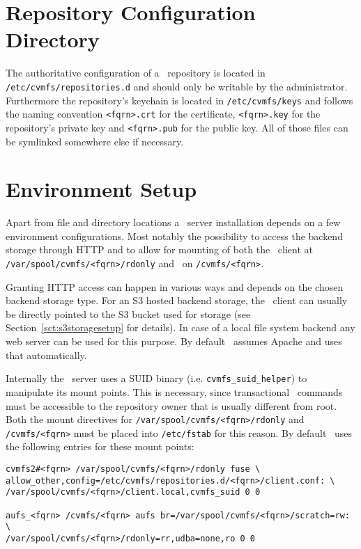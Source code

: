 \pagebreak

\section{Repository Configuration Directory}
The authoritative configuration of a \cvmfs\ repository is located in \texttt{/etc/cvmfs/repositories.d} and should only be writable by the administrator.
Furthermore the repository's keychain is located in \texttt{/etc/cvmfs/keys} and follows the naming convention \texttt{<fqrn>.crt} for the certificate, \texttt{<fqrn>.key} for the repository's private key and \texttt{<fqrn>.pub} for the public key.
All of those files can be symlinked somewhere else if necessary.

\pagebreak

\section{Environment Setup}
Apart from file and directory locations a \cvmfs\ server installation depends on a few environment configurations.
Most notably the possibility to access the backend storage through HTTP and to allow for mounting of both the \cvmfs\ client at \texttt{/var/spool/cvmfs/<fqrn>/rdonly} and \aufs\ on \texttt{/cvmfs/<fqrn>}.

Granting HTTP access can happen in various ways and depends on the chosen backend storage type.
For an S3 hosted backend storage, the \cvmfs\ client can usually be directly pointed to the S3 bucket used for storage (see Section~\ref{sct:s3storagesetup} for details).
In case of a local file system backend any web server can be used for this purpose.
By default \cvmfs\ assumes Apache and uses that automatically.

Internally the \cvmfs\ server uses a SUID binary (i.e. \texttt{cvmfs\_suid\_helper}) to manipulate its mount points.
This is necessary, since transactional \cvmfs\ commands must be accessible to the repository owner that is usually different from root.
Both the mount directives for \texttt{/var/spool/cvmfs/<fqrn>/rdonly} and \texttt{/cvmfs/<fqrn>} must be placed into \texttt{/etc/fstab} for this reason.
By default \cvmfs\ uses the following entries for these mount points:

\begin{verbatim}
cvmfs2#<fqrn> /var/spool/cvmfs/<fqrn>/rdonly fuse \
allow_other,config=/etc/cvmfs/repositories.d/<fqrn>/client.conf: \
/var/spool/cvmfs/<fqrn>/client.local,cvmfs_suid 0 0

aufs_<fqrn> /cvmfs/<fqrn> aufs br=/var/spool/cvmfs/<fqrn>/scratch=rw: \
/var/spool/cvmfs/<fqrn>/rdonly=rr,udba=none,ro 0 0
\end{verbatim}
